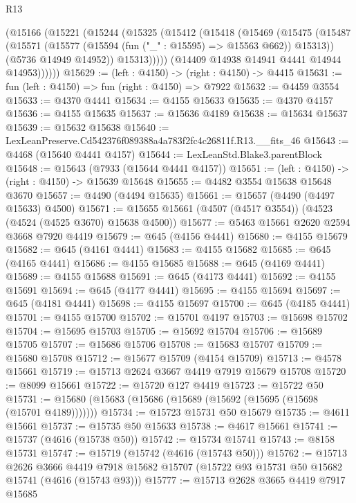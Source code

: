 \begin{lexlean}{R13}
\begin{coremodule}
        (@15166
          (@15221
            (@15244
              (@15325
                (@15412
                  (@15418
                    (@15469
                      (@15475
                        (@15487
                          (@15571 (@15577 (@15594 (fun ("_" : @15595) => @15563 @662)) @15313))
                          (@5736 @14949 @14952))
                        @15313)))))
              (@14409 @14938 @14941 @4441 @14944 @14953))))))
@15629 := (left : @4150) -> (right : @4150) -> @4415
@15631 := fun (left : @4150) => fun (right : @4150) => @7922
@15632 := @4459 @3554
@15633 := @4370 @4441
@15634 := @4155 @15633
@15635 := @4370 @4157
@15636 := @4155 @15635
@15637 := @15636 @4189
@15638 := @15634 @15637
@15639 := @15632 @15638
@15640 := LexLeanPreserve.Cd542376f089388a4a783f2fc4c26811f.R13.__fits_46
@15643 := @4468 (@15640 @4441 @4157)
@15644 := LexLeanStd.Blake3.parentBlock
@15648 := @15643 (@7933 (@15644 @4441 @4157))
@15651 := (left : @4150) -> (right : @4150) -> @15639 @15648
@15655 := @4482 @3554 @15638 @15648 @3670
@15657 := @4490 (@4494 @15635)
@15661 := @15657 (@4490 (@4497 @15633) @4500)
@15671 := @15655 @15661 (@4507 (@4517 @3554)) (@4523 (@4524 (@4525 @3670) @15638 @4500))
@15677 := @5463 @15661 @2620 @2594 @3668 @7920 @4419
@15679 := @645 (@4156 @4441)
@15680 := @4155 @15679
@15682 := @645 (@4161 @4441)
@15683 := @4155 @15682
@15685 := @645 (@4165 @4441)
@15686 := @4155 @15685
@15688 := @645 (@4169 @4441)
@15689 := @4155 @15688
@15691 := @645 (@4173 @4441)
@15692 := @4155 @15691
@15694 := @645 (@4177 @4441)
@15695 := @4155 @15694
@15697 := @645 (@4181 @4441)
@15698 := @4155 @15697
@15700 := @645 (@4185 @4441)
@15701 := @4155 @15700
@15702 := @15701 @4197
@15703 := @15698 @15702
@15704 := @15695 @15703
@15705 := @15692 @15704
@15706 := @15689 @15705
@15707 := @15686 @15706
@15708 := @15683 @15707
@15709 := @15680 @15708
@15712 := @15677 @15709 (@4154 @15709)
@15713 := @4578 @15661
@15719 := @15713 @2624 @3667 @4419 @7919 @15679 @15708
@15720 := @8099 @15661
@15722 := @15720 @127 @4419
@15723 := @15722 @50
@15731 := @15680 (@15683 (@15686 (@15689 (@15692 (@15695 (@15698 (@15701 @4189)))))))
@15734 := @15723 @15731 @50 @15679
@15735 := @4611 @15661
@15737 := @15735 @50 @15633
@15738 := @4617 @15661
@15741 := @15737 (@4616 (@15738 @50))
@15742 := @15734 @15741
@15743 := @8158 @15731
@15747 := @15719 (@15742 (@4616 (@15743 @50)))
@15762 := @15713
    @2626
    @3666
    @4419
    @7918
    @15682
    @15707
    (@15722 @93 @15731 @50 @15682 @15741 (@4616 (@15743 @93)))
@15777 := @15713
    @2628
    @3665
    @4419
    @7917
    @15685

\end{coremodule}
\end{lexlean}
